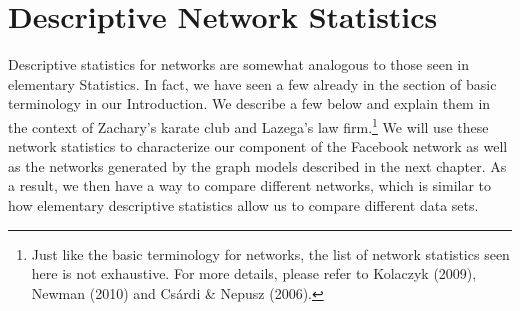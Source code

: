 \documentclass[12pt,twoside]{amherstthesis}
\begin{document}
  \chapter{Descriptive Network
  Statistics}\label{descriptive-network-statistics}
  
  Descriptive statistics for networks are somewhat analogous to those seen
  in elementary Statistics. In fact, we have seen a few already in the
  section of basic terminology in our Introduction. We describe a few
  below and explain them in the context of Zachary's karate club and
  Lazega's law firm.\footnote{Just like the basic terminology for
    networks, the list of network statistics seen here is not exhaustive.
    For more details, please refer to Kolaczyk (2009), Newman (2010) and
    Csárdi \& Nepusz (2006).} We will use these network statistics to
  characterize our component of the Facebook network as well as the
  networks generated by the graph models described in the next chapter. As
  a result, we then have a way to compare different networks, which is
  similar to how elementary descriptive statistics allow us to compare
  different data sets.
  
\end{document}
